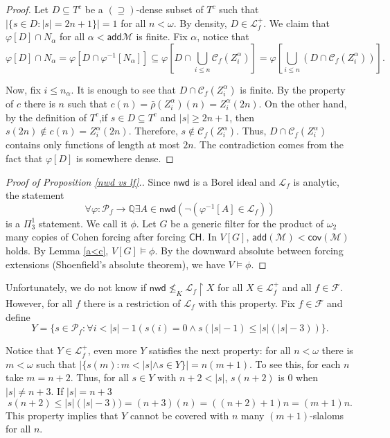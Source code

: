 \documentclass{amsart}
\theoremstyle{definition}
\theoremstyle{remark}
\numberwithin{equation}{section}
\newcommand{\CH}{\mathsf{CH}}
\newcommand{\nwd}{\mathsf{nwd}}
\newcommand{\add}{\mathsf{add}}
\newcommand{\cov}{\mathsf{cov}}
\newcommand{\lf}{\mathcal{L}_f}
\begin{document}
\begin{proof}
    Let $D\subseteq T^c$ be a $(\supseteq)$-dense subset of  $T^c$ such that $|\{s\in D: |s|=2n+1\}|=1$ for all $n<\omega$. By density, $D\in\lf^+$. We claim that $\varphi [D]\cap N_\alpha$ for all $\alpha<\add{\mathcal{M}}$ is finite. Fix $\alpha$, notice that
    \[
    \varphi[D]\cap N_\alpha =\varphi[D\cap \varphi^{-1}[N_\alpha]]\subseteq \varphi[D\cap \bigcup_{i\leq n}\mathcal{C}_f(Z_i^\alpha)] = \varphi[\bigcup_{i\leq n}(D\cap \mathcal{C}_f(Z_i^\alpha))].
    \]

    Now, fix $i\leq n_\alpha$. It is enough to see that $D\cap \mathcal{C}_f(Z_i^\alpha)$ is finite. By the property of $c$ there is $n$ such that $c(n)=\bar\rho(Z^\alpha_i)(n)=Z^\alpha_i(2n)$. On the other hand, by the definition of $T^c$,if $s\in D\subseteq T^c$ and $|s|\geq2n+1$, then $s(2n)\not\in c(n)=Z_i^\alpha(2n)$. Therefore, $s\notin \mathcal{C}_f(Z_i^\alpha)$. Thus, $D\cap \mathcal{C}_f(Z_i^\alpha)$ contains only functions of length at most $2n$. The contradiction comes from the fact that $\varphi[D]$ is somewhere dense.

\end{proof}

\begin{proof}[Proof of Proposition \ref{nwd vs lf}.]
    Since $\nwd$ is a Borel ideal and $\lf$ is analytic, the statement 
    \[\forall \varphi:\mathcal{P}_f\rightarrow \mathbb{Q} \exists A\in\nwd (\neg (\varphi^{-1}[A]\in \lf))\]
    is a $\Pi^1_3$ statement. We call it $\phi$.
    Let $G$ be a generic filter for the product of $\omega_2$ many copies of Cohen forcing after forcing $\CH$. In $V[G]$, $\add(\mathcal{M})<\cov(\mathcal{M})$ holds. By Lemma \ref{a<c}, $V[G]\models \phi$. By the downward absolute between forcing extensions (Shoenfield's absolute theorem), we have $V\models \phi$.
\end{proof}


Unfortunately, we do not know if $\nwd\not\leq_K \lf\upharpoonright X$ for all $X\in \lf^+$ and all $f\in \mathcal{F}$. However, for all $f$ there is a restriction of $\lf$ with this property. Fix $f\in \mathcal{F}$ and define
\[
Y=\{s\in\mathcal{P}_f: \forall i< |s|-1 (s(i)=0 \wedge s(|s|-1)\leq |s|(|s|-3)) \}.
\]

Notice that $Y\in\lf^+$, even more $Y$ satisfies the next property: for all $n<\omega$ there is $m<\omega$  such that $|\{s(m):m<|s| \wedge s\in Y\}|=n(m+1)$. To see this, for  each $n$ take $m=n+2$. Thus, for all $s\in Y$ with $n+2<|s|$, $s(n+2)$ is $0$ when $|s|\neq n+3$. If $|s|= n+3$
\begin{displaymath}
    s(n+2)\leq |s|(|s|-3))=(n+3)(n)=((n+2)+1)n=(m+1)n.
\end{displaymath}
 This property implies that $Y$ cannot be covered with $n$ many $(m+1)$-slaloms for all $n$.
\end{document}

